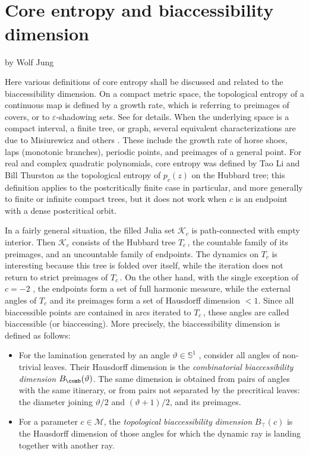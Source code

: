 \documentclass[12pt]{amsart}
\newcommand{\Circle}{\mathbb S^1}
\newcommand{\0}{\texttt{0}}
\newcommand{\1}{\texttt{1}}
\newcommand\eps{\varepsilon}
\theoremstyle{definition}
\numberwithin{equation}{section}
\renewcommand{\theta}{\vartheta}
\begin{document}
\appendix
\section{\ \\Core entropy and biaccessibility dimension}
\centerline{by Wolf Jung}

\bigskip

Here various definitions of core entropy shall be discussed and related to
the biaccessibility dimension. On a compact metric space, the topological
entropy of a continuous map is defined by a growth rate, which is referring
to preimages of covers, or to $\eps$-shadowing sets. See
\cite{BrinStuck, deMelovanStrien} for details. When the underlying space is a
compact interval, a finite tree, or graph, several equivalent characterizations
are due to Misiurewicz and others \cite{alm}. These include the growth rate of
horse shoes, laps (monotonic branches), periodic points,
and preimages of a general point.
For real and complex quadratic polynomials, core entropy was defined by
Tao Li \cite{taoli} and Bill Thurston \cite{TanLeiEntropy, bghkltt}
as the topological entropy of $p_c(z)$ on the Hubbard tree;
this definition applies to the postcritically finite case in
particular, and more generally to finite or infinite compact trees, but it
does not work when $c$ is an endpoint with a dense postcritical orbit. 

In a fairly general situation, the filled Julia set $\mathcal{K}_c$ is
path-connected with empty interior. Then $\mathcal{K}_c$ consists of the
Hubbard tree $T_c$\,, the countable family of its preimages, and an uncountable
family of endpoints. The dynamics on $T_c$ is interesting because this tree is
folded over itself, while the iteration does not return to strict preimages 
of $T_c$\,. On the other hand, with the single exception of $c=-2$
\cite{Zdunik, Smirnov, MeerkampSchleicher}, the endpoints form a set of full
harmonic measure, while the external angles of $T_c$ and its preimages form
a set of Hausdorff dimension $<1$. Since all biaccessible points are contained
in arcs iterated to $T_c$\,, these angles are called biaccessible
(or biaccessing). More precisely, the biaccessibility dimension is defined as
follows:
\begin{itemize}
\item For the lamination generated by an angle $\theta\in \Circle$
\cite{ThurstonLaminations}, consider all
angles of non-trivial leaves. Their Hausdorff dimension is the
\emph{combinatorial biaccessibility dimension} $B_\comb(\theta)$. The same
dimension is obtained from pairs of angles with the same itinerary, or from
pairs not separated by the precritical leaves: the diameter joining $\theta/2$
and $(\theta+1)/2$, and its preimages.
\item For a parameter $c\in\mathcal{M}$, the
\emph{topological biaccessibility dimension} $B_\top(c)$ is the Hausdorff
dimension of those angles for which the dynamic ray is landing together with
another ray.
\end{itemize}
\end{document}
